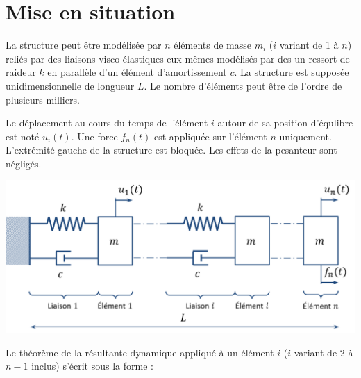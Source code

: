 \documentclass[10pt]{article}
\newif\ifxp
\begin{document}
\ifxp

\else

\fi



 \renewcommand{\baselinestretch}{1.2}
\setlength{\parskip}{2ex plus 0.5ex minus 0.2ex}



\section{Mise en situation}
La structure peut être modélisée par $n$ éléments de masse $m_i$ ($i$ variant de 1 à $n$) reliés  par des liaisons visco-élastiques eux-mêmes modélisés par des un ressort de raideur $k$ en parallèle d'un élément d'amortissement $c$. La structure est supposée unidimensionnelle de longueur $L$. Le nombre d'éléments peut être de l'ordre de plusieurs milliers. 

Le déplacement au cours du temps de l'élément $i$ autour de sa position d'équlibre est noté $u_i(t)$. Une force $f_n(t)$ est appliquée sur l'élément $n$ uniquement. L'extrémité gauche de
la structure est bloquée. Les effets de la pesanteur sont négligés.


\begin{center}
\includegraphics[width=.9\textwidth]{images/structure}
\end{center}


Le théorème de la résultante dynamique appliqué à un élément $i$ ($i$ variant de 2 à $n-1$ inclus) s'écrit sous la forme : 

\end{document}
